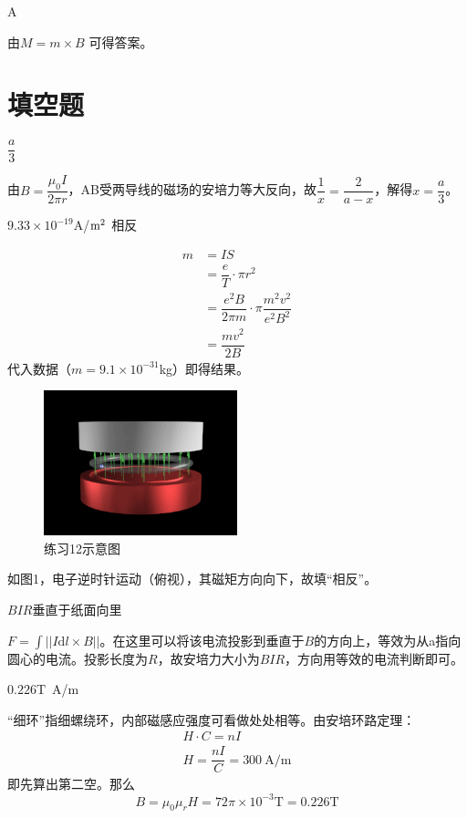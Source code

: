 \documentclass[b5paper,opensource]{./template/qyxf-book}
\newcommand{\di}[1]{\mathrm{d}#1}
\begin{document}
A

\solve
由$M=m\times B$
\footnotemark[2]
可得答案。

\section{填空题}

$\dfrac{a}{3}$

\solve
由$B=\dfrac{\mu_0I}{2\pi r}$，AB受两导线的磁场的安培力等大反向，故$\dfrac{1}{x}=\dfrac{2}{a-x}$，解得$x=\dfrac{a}{3}$。

$9.33\times 10^{-19}$A/$\rm{m}^2$ \quad 相反
 
\solve
\begin{align*}
	m&=IS\\
	&=\dfrac{e}{T}\cdot \pi r^2\\
	&=\dfrac{e^2B}{2\pi m}\cdot \pi\dfrac{m^2v^2}{e^2B^2}\\
	&=\dfrac{mv^2}{2B}
\end{align*}
代入数据（$m=9.1\times 10^{-31}$kg）即得结果。
\begin{figure}[!h]	
	\centering	
	\includegraphics[width=0.5\textwidth]{Chp9_illus1.png}	
	\caption{练习12\quad 示意图}
\end{figure}
如图1，电子逆时针运动（俯视），其磁矩方向向下，故填“相反”。

$BIR$\quad 垂直于纸面向里

\solve
$F=\int ||I\di{l}\times B||$。在这里可以将该电流投影到垂直于$B$的方向上，等效为从a指向圆心的电流。投影长度为$R$，故安培力大小为$BIR$，方向用等效的电流判断即可。

$0.226\textrm{T}$\ \textrm{A/m}

\solve
“细环”指细螺绕环，内部磁感应强度可看做处处相等。由安培环路定理：
\begin{gather*}
	H\cdot C=nI\\
	H=\dfrac{nI}{C}=300\ \textrm{A/m}
\end{gather*}
即先算出第二空。那么
\[
B=\mu_0\mu_rH=72\pi\times 10^{-3}\textrm{T}=0.226\textrm{T}
\]
\end{document}
